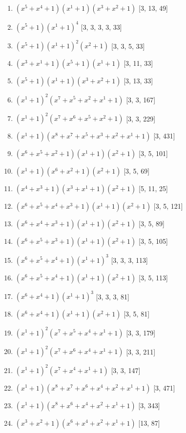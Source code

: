 \documentclass[10pt,twocolumn]{article}
\begin{document}
\begin{enumerate}
\item $(x^{5} + x^{4} + 1)(x^{1} + 1)(x^{3} + x^{2} + 1)$  [3, 13, 49]
\item $(x^{5} + 1)(x^{1} + 1)^{4}$  [3, 3, 3, 3, 33]
\item $(x^{5} + 1)(x^{1} + 1)^{2}(x^{2} + 1)$  [3, 3, 5, 33]
\item $(x^{3} + x^{1} + 1)(x^{5} + 1)(x^{1} + 1)$  [3, 11, 33]
\item $(x^{5} + 1)(x^{1} + 1)(x^{3} + x^{2} + 1)$  [3, 13, 33]
\item $(x^{1} + 1)^{2}(x^{7} + x^{5} + x^{2} + x^{1} + 1)$  [3, 3, 167]
\item $(x^{1} + 1)^{2}(x^{7} + x^{6} + x^{5} + x^{2} + 1)$  [3, 3, 229]
\item $(x^{1} + 1)(x^{8} + x^{7} + x^{5} + x^{3} + x^{2} + x^{1} + 1)$  [3, 431]
\item $(x^{6} + x^{5} + x^{2} + 1)(x^{1} + 1)(x^{2} + 1)$  [3, 5, 101]
\item $(x^{1} + 1)(x^{6} + x^{2} + 1)(x^{2} + 1)$  [3, 5, 69]
\item $(x^{4} + x^{3} + 1)(x^{3} + x^{1} + 1)(x^{2} + 1)$  [5, 11, 25]
\item $(x^{6} + x^{5} + x^{4} + x^{3} + 1)(x^{1} + 1)(x^{2} + 1)$  [3, 5, 121]
\item $(x^{6} + x^{4} + x^{3} + 1)(x^{1} + 1)(x^{2} + 1)$  [3, 5, 89]
\item $(x^{6} + x^{5} + x^{3} + 1)(x^{1} + 1)(x^{2} + 1)$  [3, 5, 105]
\item $(x^{6} + x^{5} + x^{4} + 1)(x^{1} + 1)^{3}$  [3, 3, 3, 113]
\item $(x^{6} + x^{5} + x^{4} + 1)(x^{1} + 1)(x^{2} + 1)$  [3, 5, 113]
\item $(x^{6} + x^{4} + 1)(x^{1} + 1)^{3}$  [3, 3, 3, 81]
\item $(x^{6} + x^{4} + 1)(x^{1} + 1)(x^{2} + 1)$  [3, 5, 81]
\item $(x^{1} + 1)^{2}(x^{7} + x^{5} + x^{4} + x^{1} + 1)$  [3, 3, 179]
\item $(x^{1} + 1)^{2}(x^{7} + x^{6} + x^{4} + x^{1} + 1)$  [3, 3, 211]
\item $(x^{1} + 1)^{2}(x^{7} + x^{4} + x^{1} + 1)$  [3, 3, 147]
\item $(x^{1} + 1)(x^{8} + x^{7} + x^{6} + x^{4} + x^{2} + x^{1} + 1)$  [3, 471]
\item $(x^{1} + 1)(x^{8} + x^{6} + x^{4} + x^{2} + x^{1} + 1)$  [3, 343]
\item $(x^{3} + x^{2} + 1)(x^{6} + x^{4} + x^{2} + x^{1} + 1)$  [13, 87]

\end{enumerate}
\end{document}
